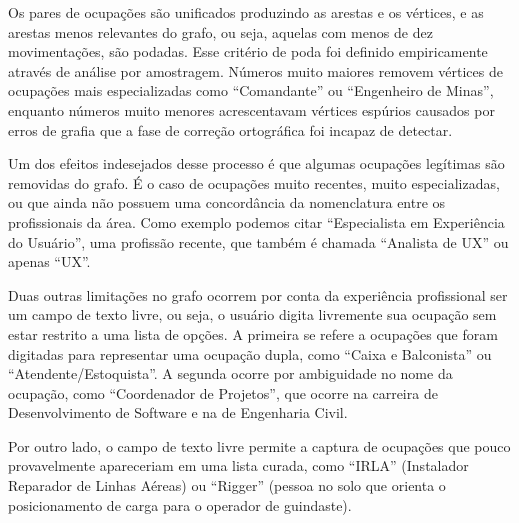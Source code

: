 \documentclass[12pt,a4paper]{article}
\theoremstyle{hypo}
\begin{document}
Os pares de ocupações são unificados produzindo as arestas e os vértices, e as arestas menos relevantes do grafo, ou seja, aquelas com menos de dez movimentações, são podadas. Esse critério de poda foi definido empiricamente através de análise por amostragem. Números muito maiores removem vértices de ocupações mais especializadas como \enquote{Comandante} ou \enquote{Engenheiro de Minas}, enquanto números muito menores acrescentavam vértices espúrios causados por erros de grafia que a fase de correção ortográfica foi incapaz de detectar.

Um dos efeitos indesejados desse processo é que algumas ocupações legítimas são removidas do grafo. É o caso de ocupações muito recentes, muito especializadas, ou que ainda não possuem uma concordância da nomenclatura entre os profissionais da área. Como exemplo podemos citar \enquote{Especialista em Experiência do Usuário}, uma profissão recente, que também é chamada \enquote{Analista de UX} ou apenas \enquote{UX}.


Duas outras limitações no grafo ocorrem por conta da experiência profissional ser um campo de texto livre, ou seja, o usuário digita livremente sua ocupação sem estar restrito a uma lista de opções. A primeira se refere a ocupações que foram digitadas para representar uma ocupação dupla, como \enquote{Caixa e Balconista} ou \enquote{Atendente/Estoquista}. A segunda ocorre por ambiguidade no nome da ocupação, como \enquote{Coordenador de Projetos}, que ocorre na carreira de Desenvolvimento de Software e na de Engenharia Civil.

Por outro lado, o campo de texto livre permite a captura de ocupações que pouco provavelmente apareceriam em uma lista curada, como \enquote{IRLA} (Instalador Reparador de Linhas Aéreas) ou \enquote{Rigger} (pessoa no solo que orienta o posicionamento de carga para o operador de guindaste).
\end{document}
